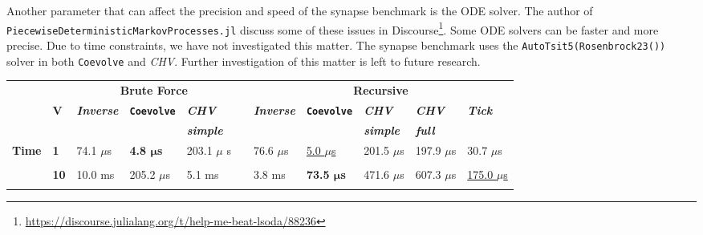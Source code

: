 \documentclass{juliacon}
\numberwithin{equation}{section}
\begin{document}
Another parameter that can affect the precision and speed of the synapse benchmark is the ODE solver. The author of \texttt{PiecewiseDeterministicMarkovProcesses.jl} discuss some of these issues in Discourse\footnote{\url{https://discourse.julialang.org/t/help-me-beat-lsoda/88236}}. Some ODE solvers can be faster and more precise. Due to time constraints, we have not investigated this matter. The synapse benchmark uses the \texttt{AutoTsit5(Rosenbrock23())} solver in both \texttt{Coevolve} and \textit{CHV}. Further investigation of this matter is left to future research.

\begin{table}
\centering
\begin{tabular*}{\linewidth}{@{\extracolsep{\fill}} cllllllllll}
\toprule
 &            & \multicolumn{3}{c}{\textbf{Brute Force}}                                         & & \multicolumn{5}{c}{\textbf{Recursive}} \\
                \cmidrule{3-5}                                                                        \cmidrule{7-11}
 & \textbf{V} & \textbf{\textit{Inverse}} & \textbf{\texttt{Coevolve}} & \textbf{\textit{CHV}}    & & \textbf{\textit{Inverse}} & \textbf{\texttt{Coevolve}} & \textbf{\textit{CHV}}    & \textbf{\textit{CHV}}  & \textbf{\textit{Tick}} \\
 &            &                           &                            & \textbf{\textit{simple}} & &                           &                            & \textbf{\textit{simple}} & \textbf{\textit{full}} &  \\
\cmidrule{1-11}
\multirow{20}{*}{\textbf{Time}} & \textbf{1}  & 74.1 \( \mu \)s  & \textbf{4.8 \( \bm{\mu} \)s}& 203.1 \( \mu \) s   & & 76.6 \( \mu \)s   & \underline{5.0 \( \mu \)s}    & 201.5 \( \mu \)s                & 197.9 \( \mu \)s             & 30.7 \( \mu \)s              \\
                                &             &                   &                             &                     & &                  &                               &                                 &                              &                              \\
                                & \textbf{10} & 10.0 ms           & 205.2 \( \mu \)s            & 5.1 ms              & & 3.8  ms          & \textbf{73.5 \( \bm{\mu} \)s} &  471.6 \( \mu \)s               & 607.3 \( \mu \)s             & \underline{175.0 \( \mu \)s} \\
                                &             &                   &                             &                     & &                  &                               &                                 &                              &                              \\

\end{tabular*}
\end{table}
\end{document}

